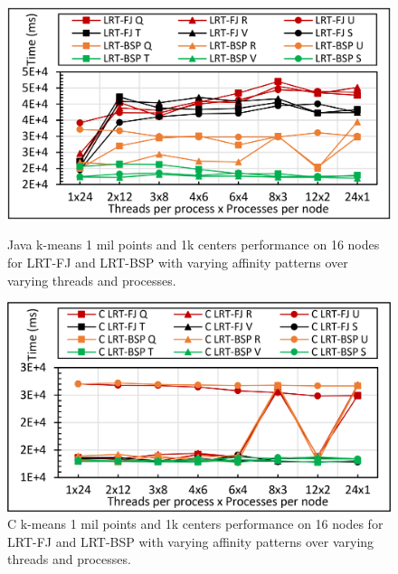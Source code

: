 \documentclass[10pt, conference, compsocconf]{IEEEtran}
\begin{document}
\begin{figure}[!htb]
    \centering
    \begin{minipage}{.49\textwidth}
        \centering        
        \includegraphics[width=1\columnwidth]{images/fig_kmeans_1mil_1k_binding_patterns}
        \caption{Java k-means 1 mil points and 1k centers performance on 16 nodes for \ac{LRT-FJ} and \ac{LRT-BSP} with varying affinity patterns over varying threads and processes.}
        \label{fig:fig_kmeans_1mil_1k_binding_patterns}
    \end{minipage}
    \hspace{1.4mm}
    \begin{minipage}{0.49\textwidth}
        \centering
        \includegraphics[width=1\columnwidth]{images/fig_C_kmeans_1mil_1k_binding_patterns}
        \caption{C k-means 1 mil points and 1k centers performance on 16 nodes for \ac{LRT-FJ} and \ac{LRT-BSP} with varying affinity patterns over varying threads and processes.}
        \label{fig:fig_C_kmeans_1mil_1k_binding_patterns}
    \end{minipage}   
\end{figure}
\end{document}
